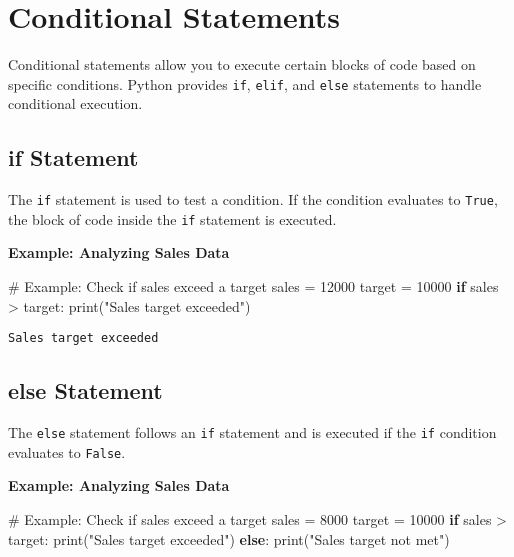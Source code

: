 \documentclass[
  letterpaper,
  DIV=11,
  numbers=noendperiod]{scrreprt}
\newenvironment{Shaded}{\begin{snugshade}}{\end{snugshade}}
\newcommand{\BuiltInTok}[1]{\textcolor[rgb]{0.00,0.23,0.31}{#1}}
\newcommand{\CommentTok}[1]{\textcolor[rgb]{0.37,0.37,0.37}{#1}}
\newcommand{\ControlFlowTok}[1]{\textcolor[rgb]{0.00,0.23,0.31}{\textbf{#1}}}
\newcommand{\DecValTok}[1]{\textcolor[rgb]{0.68,0.00,0.00}{#1}}
\newcommand{\NormalTok}[1]{\textcolor[rgb]{0.00,0.23,0.31}{#1}}
\newcommand{\OperatorTok}[1]{\textcolor[rgb]{0.37,0.37,0.37}{#1}}
\newcommand{\StringTok}[1]{\textcolor[rgb]{0.13,0.47,0.30}{#1}}
\begin{document}
\section{Conditional Statements}\label{conditional-statements-3}

Conditional statements allow you to execute certain blocks of code based
on specific conditions. Python provides \texttt{if}, \texttt{elif}, and
\texttt{else} statements to handle conditional execution.

\subsection{if Statement}\label{if-statement}

The \texttt{if} statement is used to test a condition. If the condition
evaluates to \texttt{True}, the block of code inside the \texttt{if}
statement is executed.

\textbf{Example: Analyzing Sales Data}

\begin{Shaded}
\begin{Highlighting}[]
\CommentTok{\# Example: Check if sales exceed a target}
\NormalTok{sales }\OperatorTok{=} \DecValTok{12000}
\NormalTok{target }\OperatorTok{=} \DecValTok{10000}
\ControlFlowTok{if}\NormalTok{ sales }\OperatorTok{\textgreater{}}\NormalTok{ target:}
    \BuiltInTok{print}\NormalTok{(}\StringTok{"Sales target exceeded"}\NormalTok{)}
\end{Highlighting}
\end{Shaded}

\begin{verbatim}
Sales target exceeded
\end{verbatim}

\subsection{else Statement}\label{else-statement}

The \texttt{else} statement follows an \texttt{if} statement and is
executed if the \texttt{if} condition evaluates to \texttt{False}.

\textbf{Example: Analyzing Sales Data}

\begin{Shaded}
\begin{Highlighting}[]
\CommentTok{\# Example: Check if sales exceed a target}
\NormalTok{sales }\OperatorTok{=} \DecValTok{8000}
\NormalTok{target }\OperatorTok{=} \DecValTok{10000}
\ControlFlowTok{if}\NormalTok{ sales }\OperatorTok{\textgreater{}}\NormalTok{ target:}
    \BuiltInTok{print}\NormalTok{(}\StringTok{"Sales target exceeded"}\NormalTok{)}
\ControlFlowTok{else}\NormalTok{:}
    \BuiltInTok{print}\NormalTok{(}\StringTok{"Sales target not met"}\NormalTok{)}
\end{Highlighting}
\end{Shaded}
\end{document}
